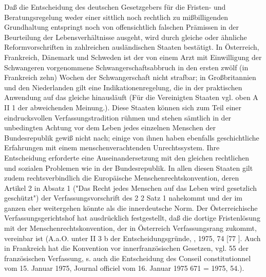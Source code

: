 \documentclass[12pt]{article}
\begin{document}
\syncleft
\begin{sourcepara}
Daß die Entscheidung des deutschen Gesetzgebers für die Fristen- und Beratungsregelung weder einer sittlich noch rechtlich zu mißbilligenden Grundhaltung entspringt noch von offensichtlich falschen Prämissen in der Beurteilung der Lebensverhältnisse ausgeht, wird durch gleiche oder ähnliche Reformvorschriften in zahlreichen ausländischen Staaten bestätigt. In Österreich, Frankreich, Dänemark und Schweden ist der von einem Arzt mit Einwilligung der Schwangeren vorgenommene Schwangerschaftsabbruch in den ersten zwölf (in Frankreich zehn) Wochen der Schwangerschaft nicht strafbar; in Großbritannien und den Niederlanden gilt eine Indikationenregelung, die in der praktischen Anwendung auf das gleiche hinausläuft (Für die Vereinigten Staaten vgl. oben A II 1 der abweichenden Meinung.). Diese Staaten können sich zum Teil einer eindrucksvollen Verfassungstradition rühmen und stehen sämtlich in der unbedingten Achtung vor dem Leben jedes einzelnen Menschen der Bundesrepublik gewiß nicht nach; einige von ihnen haben ebenfalls geschichtliche Erfahrungen mit einem menschenverachtenden Unrechtssystem. Ihre Entscheidung erforderte eine Auseinandersetzung mit den gleichen rechtlichen und sozialen Problemen wie in der Bundesrepublik. In allen diesen Staaten gilt zudem rechtsverbindlich die Europäische Menschenrechtskonvention, deren Artikel 2 in Absatz 1 ("Das Recht jedes Menschen auf das Leben wird gesetzlich geschützt") der Verfassungsvorschrift des \abbrArt{} 2 \abbrAbs{} 2 Satz 1 \abbrGG{}\ggfnArtTwoTwoOneDE{} nahekommt und der im ganzen eher weitergehen könnte als die innerdeutsche Norm. Der Österreichische Verfassungsgerichtshof hat ausdrücklich festgestellt, daß die dortige Fristenlösung mit der Menschenrechtskonvention, der in Österreich Verfassungsrang zukommt, vereinbar ist (A.a.O. unter II 3 b der Entscheidungsgründe, \abbrEuGRZ{}, 1975, \abbrS{} 74 [77 \abbrF{}]. Auch in Frankreich hat die Konvention vor innerfranzösischen Gesetzen, vgl. \abbrArt{} 55 der französischen Verfassung, s. auch die Entscheidung des Conseil constitutionnel vom 15. Januar 1975, Journal officiel vom 16. Januar 1975 \abbrS{} 671 = \abbrEuGRZ{} 1975, \abbrS{} 54.).
\end{sourcepara}
\end{document}
